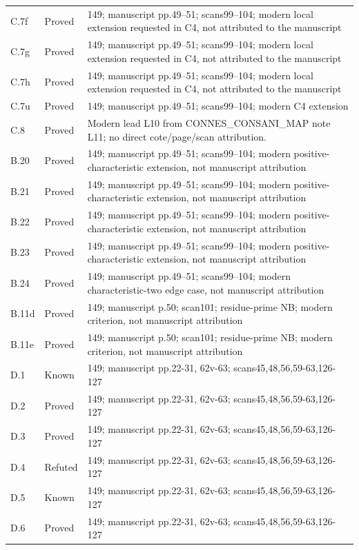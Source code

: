 {\begin{longtable}{p{1.9cm}p{1.7cm}p{10.3cm}}
C.7f & Proved & 149; manuscript pp.49–51; scans99–104; modern local extension requested in C4, not attributed to the manuscript \\
C.7g & Proved & 149; manuscript pp.49–51; scans99–104; modern local extension requested in C4, not attributed to the manuscript \\
C.7h & Proved & 149; manuscript pp.49–51; scans99–104; modern local extension requested in C4, not attributed to the manuscript \\
C.7u & Proved & 149; manuscript pp.49–51; scans99–104; modern C4 extension \\
C.8 & Proved & Modern lead L10 from CONNES\_CONSANI\_MAP note L11; no direct cote/page/scan attribution. \\
B.20 & Proved & 149; manuscript pp.49–51; scans99–104; modern positive-characteristic extension, not manuscript attribution \\
B.21 & Proved & 149; manuscript pp.49–51; scans99–104; modern positive-characteristic extension, not manuscript attribution \\
B.22 & Proved & 149; manuscript pp.49–51; scans99–104; modern positive-characteristic extension, not manuscript attribution \\
B.23 & Proved & 149; manuscript pp.49–51; scans99–104; modern positive-characteristic extension, not manuscript attribution \\
B.24 & Proved & 149; manuscript pp.49–51; scans99–104; modern characteristic-two edge case, not manuscript attribution \\
B.11d & Proved & 149; manuscript p.50; scan101; residue-prime NB; modern criterion, not manuscript attribution \\
B.11e & Proved & 149; manuscript p.50; scan101; residue-prime NB; modern criterion, not manuscript attribution \\
D.1 & Known & 149; manuscript pp.22-31, 62v-63; scans45,48,56,59-63,126-127 \\
D.2 & Proved & 149; manuscript pp.22-31, 62v-63; scans45,48,56,59-63,126-127 \\
D.3 & Proved & 149; manuscript pp.22-31, 62v-63; scans45,48,56,59-63,126-127 \\
D.4 & Refuted & 149; manuscript pp.22-31, 62v-63; scans45,48,56,59-63,126-127 \\
D.5 & Known & 149; manuscript pp.22-31, 62v-63; scans45,48,56,59-63,126-127 \\
D.6 & Proved & 149; manuscript pp.22-31, 62v-63; scans45,48,56,59-63,126-127 \\

\end{longtable}}
